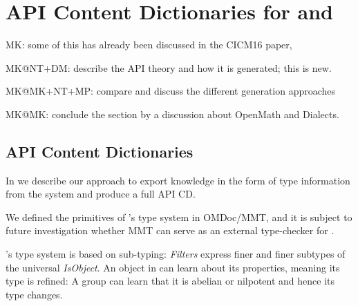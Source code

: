 \section{API Content Dictionaries for \GAP and \Sage}\label{sec:apit}
\begin{todolist}{MK: some of this has already been discussed in the CICM16 paper, }
\item MK@NT+DM: describe the \Sage API theory and how it is generated; this is
  new. 
\item MK@MK+NT+MP: compare and discuss the different generation approaches
\item MK@MK: conclude the section by a discussion about OpenMath and Dialects.
\end{todolist}


\subsection{\GAP API Content Dictionaries}

In \cite{DehKohKon:iop16} we describe our approach to export knowledge in the
form of type information from the \GAP system and produce a full \GAP API CD.

We defined the primitives of \GAP's type system in OMDoc/MMT, and it is
subject to future investigation whether MMT can serve as an external type-checker
for \GAP.

\GAP's type system is based on sub-typing: \emph{Filters} express finer and finer
subtypes of the universal \emph{IsObject}. An object in \GAP can learn about its
properties, meaning its type is refined: A group can learn that it is abelian or
nilpotent and hence its type changes.

